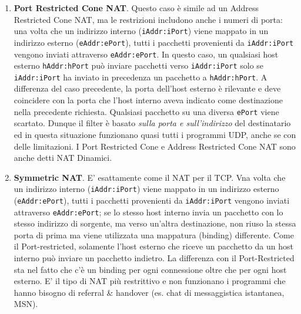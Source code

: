 \begin{enumerate}
	\item \textbf{Port Restricted Cone NAT}. Questo caso è simile ad un Address Restricted Cone NAT, ma le restrizioni includono anche i numeri di porta: una volta che un indirizzo interno (\texttt{iAddr:iPort}) viene mappato in un indirizzo esterno (\texttt{eAddr:ePort}), tutti i pacchetti provenienti da \texttt{iAddr:iPort} vengono inviati attraverso \texttt{eAddr:ePort}. In questo caso, un qualsiasi host esterno \texttt{hAddr:hPort} può inviare pacchetti verso \texttt{iAddr:iPort} solo se \texttt{iAddr:iPort} ha inviato in precedenza un pacchetto a \texttt{hAddr:hPort}. A differenza del caso precedente, la porta dell'host esterno è rilevante e deve coincidere con la porta che l'host interno aveva indicato come destinazione nella precedente richiesta. Qualsiasi pacchetto su una diversa \texttt{ePort} viene scartato. Dunque il filter è basato \textit{sulla porta e sull'indirizzo} del destinatario ed in questa situazione funzionano quasi tutti i programmi UDP, anche se con delle limitazioni. I Port Restricted Cone e Address Restricted Cone NAT sono anche detti NAT Dinamici.
	
	\item \textbf{Symmetric NAT}. E' esattamente come il NAT per il TCP. Vna volta che un indirizzo interno (\texttt{iAddr:iPort}) viene mappato in un indirizzo esterno (\texttt{eAddr:ePort}), tutti i pacchetti provenienti da \texttt{iAddr:iPort} vengono inviati attraverso \texttt{eAddr:ePort}; se lo stesso host interno invia un pacchetto con lo stesso indirizzo di sorgente, ma verso un'altra destinazione, non riuso la stessa porta di prima ma viene utilizzata una mappatura (binding) differente. Come il Port-restricted, solamente l'host esterno che riceve un pacchetto da un host interno può inviare un pacchetto indietro. La differenza con il Port-Restricted sta nel fatto che c'è un binding per ogni connessione oltre che per ogni host esterno. E' il tipo di NAT più restrittivo e non funzionano i programmi che hanno bisogno di referral \& handover (es. chat di messaggistica istantanea, MSN).	
\end{enumerate}
